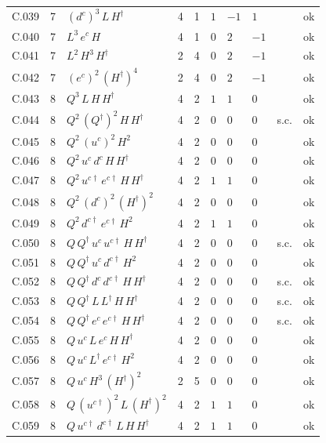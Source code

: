 {\begin{longtable}{@{}ll>{\raggedright\arraybackslash}p{6.4cm}rrllllr@{}}
C.039 & 7 & $(d^c)^{3}\,L\,H^\dagger$ & 4 & 1 & $1$ & $-1$ & $1$ &  & ok \\
C.040 & 7 & $L^{3}\,e^c\,H$ & 4 & 1 & $0$ & $2$ & $-1$ &  & ok \\
C.041 & 7 & $L^{2}\,H^{3}\,H^\dagger$ & 2 & 4 & $0$ & $2$ & $-1$ &  & ok \\
C.042 & 7 & $(e^c)^{2}\,(H^\dagger)^{4}$ & 2 & 4 & $0$ & $2$ & $-1$ &  & ok \\
C.043 & 8 & $Q^{3}\,L\,H\,H^\dagger$ & 4 & 2 & $1$ & $1$ & $0$ &  & ok \\
C.044 & 8 & $Q^{2}\,(Q^\dagger)^{2}\,H\,H^\dagger$ & 4 & 2 & $0$ & $0$ & $0$ & s.c. & ok \\
C.045 & 8 & $Q^{2}\,(u^c)^{2}\,H^{2}$ & 4 & 2 & $0$ & $0$ & $0$ &  & ok \\
C.046 & 8 & $Q^{2}\,u^c\,d^c\,H\,H^\dagger$ & 4 & 2 & $0$ & $0$ & $0$ &  & ok \\
C.047 & 8 & $Q^{2}\,u^{c\dagger}\,e^{c\dagger}\,H\,H^\dagger$ & 4 & 2 & $1$ & $1$ & $0$ &  & ok \\
C.048 & 8 & $Q^{2}\,(d^c)^{2}\,(H^\dagger)^{2}$ & 4 & 2 & $0$ & $0$ & $0$ &  & ok \\
C.049 & 8 & $Q^{2}\,d^{c\dagger}\,e^{c\dagger}\,H^{2}$ & 4 & 2 & $1$ & $1$ & $0$ &  & ok \\
C.050 & 8 & $Q\,Q^\dagger\,u^c\,u^{c\dagger}\,H\,H^\dagger$ & 4 & 2 & $0$ & $0$ & $0$ & s.c. & ok \\
C.051 & 8 & $Q\,Q^\dagger\,u^c\,d^{c\dagger}\,H^{2}$ & 4 & 2 & $0$ & $0$ & $0$ &  & ok \\
C.052 & 8 & $Q\,Q^\dagger\,d^c\,d^{c\dagger}\,H\,H^\dagger$ & 4 & 2 & $0$ & $0$ & $0$ & s.c. & ok \\
C.053 & 8 & $Q\,Q^\dagger\,L\,L^\dagger\,H\,H^\dagger$ & 4 & 2 & $0$ & $0$ & $0$ & s.c. & ok \\
C.054 & 8 & $Q\,Q^\dagger\,e^c\,e^{c\dagger}\,H\,H^\dagger$ & 4 & 2 & $0$ & $0$ & $0$ & s.c. & ok \\
C.055 & 8 & $Q\,u^c\,L\,e^c\,H\,H^\dagger$ & 4 & 2 & $0$ & $0$ & $0$ &  & ok \\
C.056 & 8 & $Q\,u^c\,L^\dagger\,e^{c\dagger}\,H^{2}$ & 4 & 2 & $0$ & $0$ & $0$ &  & ok \\
C.057 & 8 & $Q\,u^c\,H^{3}\,(H^\dagger)^{2}$ & 2 & 5 & $0$ & $0$ & $0$ &  & ok \\
C.058 & 8 & $Q\,(u^{c\dagger})^{2}\,L\,(H^\dagger)^{2}$ & 4 & 2 & $1$ & $1$ & $0$ &  & ok \\
C.059 & 8 & $Q\,u^{c\dagger}\,d^{c\dagger}\,L\,H\,H^\dagger$ & 4 & 2 & $1$ & $1$ & $0$ &  & ok \\

\end{longtable}}
